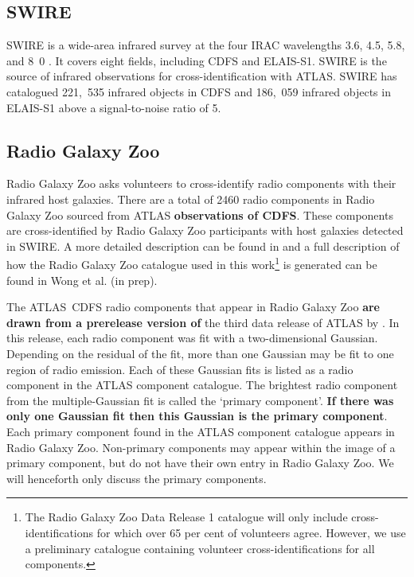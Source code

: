 \documentclass[fleqn,usenatbib,usedcolumn]{mnras}
\newcommand{\edited}[1]{{\bf {#1}}}
\begin{document}
  \subsection{SWIRE}\label{sec:swire}

    SWIRE is a wide-area infrared
    survey at the four IRAC wavelengths 3.6, 4.5, 5.8, and
    \unit{8.0}{\micro\meter} \citep{onsdale03swire, surace05swire}. It covers eight fields, including CDFS and ELAIS-S1. SWIRE is the source of infrared
    observations for cross-identification with ATLAS. SWIRE has catalogued 221,~535
    infrared objects in CDFS and 186,~059 infrared objects in ELAIS-S1 above a signal-to-noise ratio of 5.

  \subsection{Radio Galaxy Zoo}\label{sec:rgz}

    Radio Galaxy Zoo asks volunteers to cross-identify radio components with
    their infrared host galaxies. There are a total of 2460 radio components
    in Radio Galaxy Zoo sourced from ATLAS \edited{observations of CDFS}. These components are
    cross-identified by Radio Galaxy Zoo participants with host galaxies
    detected in SWIRE. A more detailed description can be found in
    \citet{banfield15} and a full description of how the Radio Galaxy Zoo catalogue used in this work\footnote{The Radio Galaxy Zoo Data
    Release 1 catalogue will only include cross-identifications for which over
    65 per cent of volunteers agree. However, we use a preliminary catalogue containing volunteer
    cross-identifications for all components.} is generated can be found in Wong
    et al. (in prep).

    The ATLAS~CDFS radio components that appear in Radio Galaxy Zoo \edited{are drawn from a prerelease version of} the third data release
    of ATLAS by \citet{franzen15}. In this release, each radio component was fit with a
    two-dimensional Gaussian. Depending on the residual of the fit, more than
    one Gaussian may be fit to one region of radio emission. Each of these
    Gaussian fits is listed as a radio component in the ATLAS component catalogue. The
    brightest radio component from the multiple-Gaussian fit is called the
    `primary component'. \edited{If there was only one Gaussian fit then this Gaussian is the primary component}. Each primary component found in the ATLAS
    component catalogue appears in Radio Galaxy Zoo. Non-primary components
    may appear within the image of a primary component, but do not have their
    own entry in Radio Galaxy Zoo. We will henceforth only discuss the primary
    components.
\end{document}
